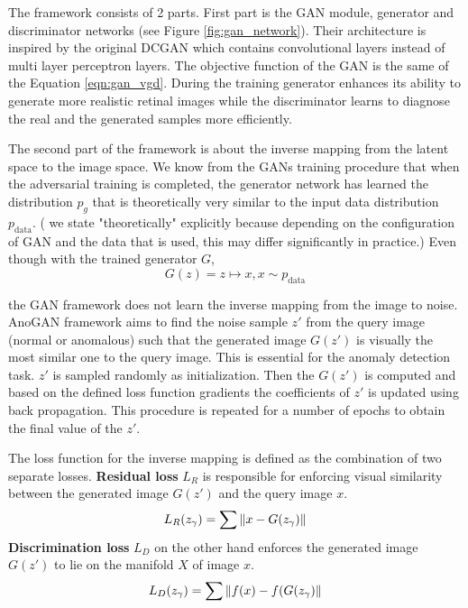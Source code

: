 {The framework consists of 2 parts. First part is the GAN module, generator and discriminator
networks (see Figure \ref{fig:gan_network}). Their architecture is inspired by the original DCGAN
\cite{Radford2016UnsupervisedRL} which contains convolutional layers instead of multi layer perceptron 
layers. The objective function of the GAN is the same of the Equation \ref{eqn:gan_vgd}. 
During the training generator enhances its ability to generate more realistic
retinal images while the discriminator learns to diagnose the real and the generated samples more
efficiently. 

The second part of the framework is about the inverse mapping from the latent space to the image space. 
We know from the GANs training procedure that when the adversarial training is completed, the generator
network has learned the distribution $p_g$ that is theoretically very similar to the input data
distribution $p_{\text{data}}$. ( we state "theoretically" explicitly because depending on the
configuration of GAN and the data that is used, this may differ significantly in practice.) 
Even though with the trained generator $G$, 
$$
G(z) = z \mapsto x,x \sim p_{\text{data}}
$$

the GAN framework does not learn the inverse mapping from the image to noise. AnoGAN framework
aims to find the noise sample $z\prime$ from the query image (normal or anomalous) such that the
generated image $G(z\prime)$ is visually the most similar one to the query image. This is essential
for the anomaly detection task. $z\prime$ is sampled randomly as initialization. Then the
$G(z\prime)$ is computed and based on the defined loss function gradients the coefficients of
$z\prime$ is updated using back propagation. This procedure is repeated for a number of epochs to
obtain the final value of the $z\prime$. 

The loss function for the inverse mapping is defined as the combination of two separate losses.
\textbf{Residual loss} $L_R$ is responsible for enforcing visual similarity between the generated image
$G(z\prime)$ and the query image $x$.
\begin{equation}
    \label{eqn:anogan_rl}
    L_R (z_{\gamma}) = \sum \left\lVert x - G(z_{\gamma})\right\rVert
\end{equation} 
\textbf{Discrimination loss} $L_D$ on the other hand enforces the
generated image $G(z\prime)$ to lie on the manifold $X$ of image $x$.
\begin{equation}
    \label{eqn:anogan_dl}
    L_D (z_{\gamma}) = \sum  \left\lVert f(x) - f(G(z_{\gamma})\right\rVert
\end{equation}

}
